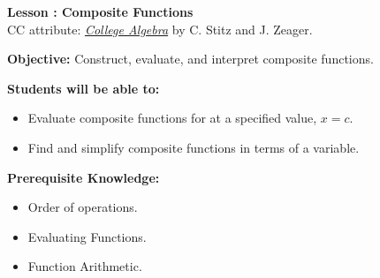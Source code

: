 \documentclass[12pt]{article}
\theoremstyle{definition}
\begin{document}
{\bf \large Lesson : Composite Functions}
\\ CC attribute: \href{http://www.stitz-zeager.com}{\it{College Algebra}} by C. Stitz and J. Zeager. 
\hfill \doclicenseImage[imagewidth=5em]\\
\par
{\bf Objective:} 	Construct, evaluate, and interpret composite functions.\\
\par
{\bf Students will be able to:}
\begin{itemize}
	\item Evaluate composite functions for at a specified value, $x=c$.
	\item Find and simplify composite functions in terms of a variable.
\end{itemize}
{\bf Prerequisite Knowledge:}
\begin{itemize}
	\item Order of operations.
	\item Evaluating Functions.
	\item Function Arithmetic.
\end{itemize}
\hrulefill
\end{document}
